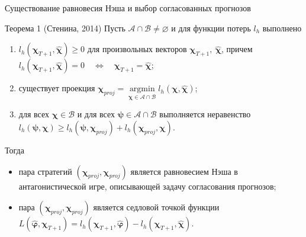 \documentclass{beamer}
\newcommand\argmin{\mathop{\arg\min}}
\newcommand{\A}{\mathcal{A}}
\newcommand{\hchi}{\hat{\boldsymbol{\chi}}}
\newcommand{\hphi}{\hat{\boldsymbol{\varphi}}}
\newcommand{\B}{\mathcal{B}}
\begin{document}
\begin{frame}{Существование равновесия Нэша и выбор согласованных прогнозов}

    \begin{block}{Теорема 1 (Стенина, 2014)}
        Пусть $\A \cap \B \neq \varnothing$ и для функции потерь $l_h$ выполнено
        \begin{enumerate}
            \item $l_h(\boldsymbol{\chi}_{T+1}, \hchi) \geq 0$ для произвольных векторов $\boldsymbol{\chi}_{T+1},
            ~\hchi$, причем $l_h(\boldsymbol{\chi}_{T+1}, \hchi) = 0 \quad \Leftrightarrow \quad
            \boldsymbol{\chi}_{T+1} = \hchi$;
            \item существует проекция $\boldsymbol{\chi}_{proj} = \argmin\limits_{\boldsymbol{\chi} \in \A \cap \B}
            l_h(\boldsymbol{\chi}, \hchi)$;
            \item для всех $\boldsymbol{\chi} \in \B$ и для всех $\boldsymbol{\psi} \in \A \cap \B$
            выполняется неравенство $l_h(\boldsymbol{\psi}, \boldsymbol{\chi}) \geq l_h(\boldsymbol{\psi}, \boldsymbol{\chi}_{proj}) + l_h(\boldsymbol{\chi}_{proj},
            \boldsymbol{\chi})$.
        \end{enumerate}
        Тогда
        \begin{itemize}
            \item пара стратегий $(\boldsymbol{\chi}_{proj}, \boldsymbol{\chi}_{proj})$
                является равновесием Нэша в антагонистической игре,
                описывающей задачу согласования прогнозов;
            \item пара $(\boldsymbol{\chi}_{proj}, \boldsymbol{\chi}_{proj})$ является
                седловой точкой функции $L(\hphi, \boldsymbol{\chi}_{T+1}) =
                l_h(\boldsymbol{\chi}_{T+1}, \hphi) - l_h(\boldsymbol{\chi}_{T+1}, \hchi)$.
        \end{itemize}
    \end{block}

\end{frame}
%
\end{document}
